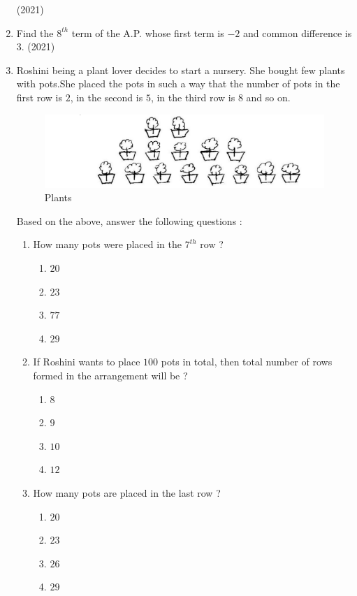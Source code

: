 \begin{enumerate}[label=\thesubsection.\arabic*,ref=\thesubsection.\theenumi,itemsep=1pt]
	\hfill (2021) \item Find the $8^{th}$ term of the A.P. whose first term is $-2$ and common difference is $3$.
	\hfill (2021) \item
	Roshini being a plant lover decides to start a nursery. She bought few plants with pots.She placed the pots in such a way that the number of pots in the first row is $2$, in the second is $5$, in the third row is $8$ and so on.
		\begin{figure}[h]
			\centering	
			\includegraphics[width=\columnwidth]{figs/ap/Plant.png}
			\caption{Plants}
			\label{fig:Plants}
		\end{figure}
		Based on the above, answer the following questions :
		\begin{enumerate}[label=(\roman*)]
\item How many pots were placed in the $7^{th}$ row ?
				\begin{enumerate}[label=\Alph*]
					 \item $20$
					 \item $23$
					 \item $77$
					 \item $29$
				\end{enumerate}
 \item If Roshini wants to place $100$ pots in total, then total number of rows formed in the arrangement will be ?
				\begin{enumerate}[label=\Alph*]
					 \item $8$
					 \item $9$
					 \item $10$
					 \item $12$
				\end{enumerate}
 \item How many pots are placed in the last row ?
				\begin{enumerate}[label=\Alph*]
					 \item $20$
					 \item $23$
					 \item $26$
					 \item $29$
				\end{enumerate}

\end{enumerate}
\end{enumerate}
